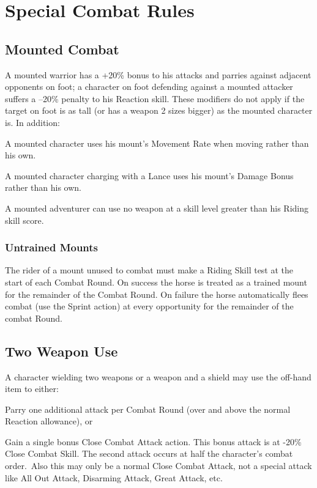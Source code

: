 \section{Special Combat Rules}

\subsection{Mounted Combat}
A mounted warrior has a +20\% bonus to his attacks and parries against adjacent opponents on foot; a character on foot defending against a mounted attacker suffers a –20\% penalty to his Reaction skill. These modifiers do not apply if the target on foot is as tall (or has a weapon 2 sizes bigger) as the mounted character is. In addition:
\begin{rpg-list}
\item A mounted character uses his mount’s Movement Rate when moving rather than his own.
\item A mounted character charging with a Lance uses his mount’s Damage Bonus rather than his own.
\item A mounted adventurer can use no weapon at a skill level greater than his Riding skill score. 
\end{rpg-list}

\subsubsection{Untrained Mounts}
The rider of a mount unused to combat must make a Riding Skill test at the start of each Combat Round.
On success the horse is treated as a trained mount for the remainder of the Combat Round. 
On failure the horse automatically flees combat (use the Sprint action) at every opportunity for the remainder of the combat Round. 


\subsection{Two Weapon Use}
A character wielding two weapons or a weapon and a shield may use the off-hand item to either: 
\begin{rpg-list}
\item Parry one additional attack per Combat Round (over and above the normal Reaction allowance), or
\item Gain a single bonus Close Combat Attack action. This bonus attack is at -20\% Close Combat Skill. The second attack occurs at half the character’s combat order. Also this may only be a normal Close Combat Attack, not a special attack like All Out Attack, Disarming Attack,  Great Attack, etc.
\end{rpg-list}

